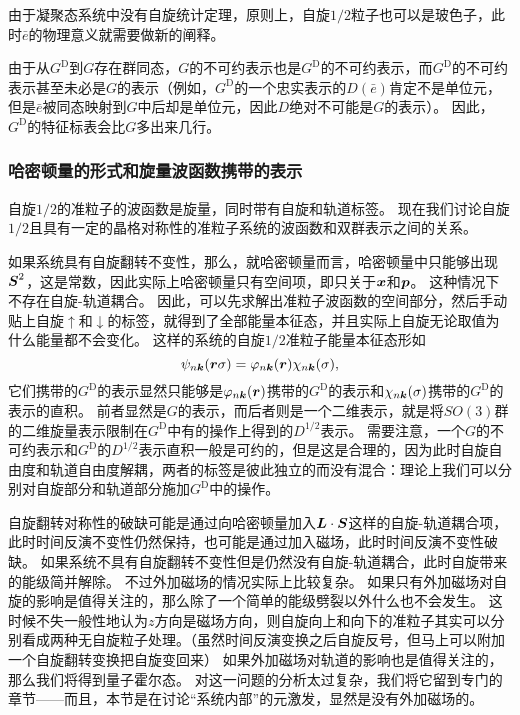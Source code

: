 由于凝聚态系统中没有自旋统计定理，原则上，自旋$1/2$粒子也可以是玻色子，此时$\bar{e}$的物理意义就需要做新的阐释。

由于从$G^\text{D}$到$G$存在群同态，$G$的不可约表示也是$G^\text{D}$的不可约表示，而$G^\text{D}$的不可约表示甚至未必是$G$的表示（例如，$G^\text{D}$的一个忠实表示的$D(\bar{e})$肯定不是单位元，但是$\bar{e}$被同态映射到$G$中后却是单位元，因此$D$绝对不可能是$G$的表示）。
因此，$G^\text{D}$的特征标表会比$G$多出来几行。

\subsubsection{哈密顿量的形式和旋量波函数携带的表示}

自旋$1/2$的准粒子的波函数是旋量，同时带有自旋和轨道标签。
现在我们讨论自旋$1/2$且具有一定的晶格对称性的准粒子系统的波函数和双群表示之间的关系。

如果系统具有自旋翻转不变性，那么，就哈密顿量而言，哈密顿量中只能够出现$\vb*{S}^2$，这是常数，因此实际上哈密顿量只有空间项，即只关于$\vb*{x}$和$\vb*{p}$。
这种情况下不存在自旋-轨道耦合。
因此，可以先求解出准粒子波函数的空间部分，然后手动贴上自旋$\uparrow$和$\downarrow$的标签，就得到了全部能量本征态，并且实际上自旋无论取值为什么能量都不会变化。
这样的系统的自旋$1/2$准粒子能量本征态形如
\begin{equation}
    \psi_{n \vb*{k}}(\vb*{r} \sigma) = \varphi_{n \vb*{k}}(\vb*{r}) \chi_{n \vb*{k}}(\sigma),
\end{equation}
它们携带的$G^\text{D}$的表示显然只能够是$\varphi_{n \vb*{k}}(\vb*{r})$携带的$G^\text{D}$的表示和$\chi_{n \vb*{k}}(\sigma)$携带的$G^\text{D}$的表示的直积。
前者显然是$G$的表示，而后者则是一个二维表示，就是将$SO(3)$群的二维旋量表示限制在$G^\text{D}$中有的操作上得到的$D^{1/2}$表示。
需要注意，一个$G$的不可约表示和$G^\text{D}$的$D^{1/2}$表示直积一般是可约的，但是这是合理的，因为此时自旋自由度和轨道自由度解耦，两者的标签是彼此独立的而没有混合：理论上我们可以分别对自旋部分和轨道部分施加$G^\text{D}$中的操作。

自旋翻转对称性的破缺可能是通过向哈密顿量加入$\vb*{L} \cdot \vb*{S}$这样的自旋-轨道耦合项，此时时间反演不变性仍然保持，也可能是通过加入磁场，此时时间反演不变性破缺。
如果系统不具有自旋翻转不变性但是仍然没有自旋-轨道耦合，此时自旋带来的能级简并解除。
不过外加磁场的情况实际上比较复杂。
如果只有外加磁场对自旋的影响是值得关注的，那么除了一个简单的能级劈裂以外什么也不会发生。
这时候不失一般性地认为$z$方向是磁场方向，则自旋向上和向下的准粒子其实可以分别看成两种无自旋粒子处理。（虽然时间反演变换之后自旋反号，但马上可以附加一个自旋翻转变换把自旋变回来）
如果外加磁场对轨道的影响也是值得关注的，那么我们将得到量子霍尔态。
对这一问题的分析太过复杂，我们将它留到专门的章节——而且，本节是在讨论“系统内部”的元激发，显然是没有外加磁场的。

